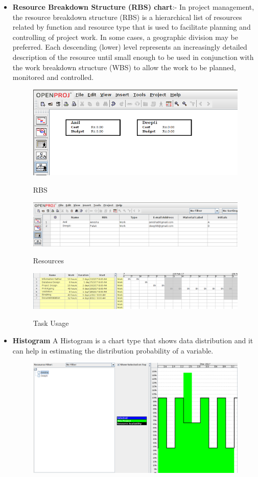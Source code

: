 \begin{itemize}
\item {\textbf{Resource Breakdown Structure (RBS) chart}}:- In project management, the resource breakdown structure (RBS) is a hierarchical list of resources related by function and resource type that is used to facilitate planning and controlling of project work. In some cases, a geographic division may be preferred. Each descending (lower) level represents an increasingly detailed description of the resource until small enough to be used in conjunction with the work breakdown structure (WBS) to allow the work to be planned, monitored and controlled.
\begin{figure}[!ht]
\centering
\includegraphics[width=0.8\linewidth]{input/images/RBS.png}
\label{fig:image1}
\caption{RBS}
\end{figure}
\begin{figure}[!ht]
\centering
\includegraphics[width=0.8\linewidth]{input/images/resources.png}
\label{fig:image1}
\caption{Resources}
\end{figure}
\begin{figure}[!ht]
\centering
\includegraphics[width=0.8\linewidth]{input/images/sefinal.png}
\label{fig:image1}
\caption{Task Usage}
\end{figure}
\item\textbf{Histogram} A Histogram is a chart type that shows data distribution and it can help in estimating the distribution probability of a variable.
\begin{figure}[!ht]
\centering
\includegraphics[width=0.9\linewidth]{input/images/his.png}

\end{figure}
\end{itemize}
